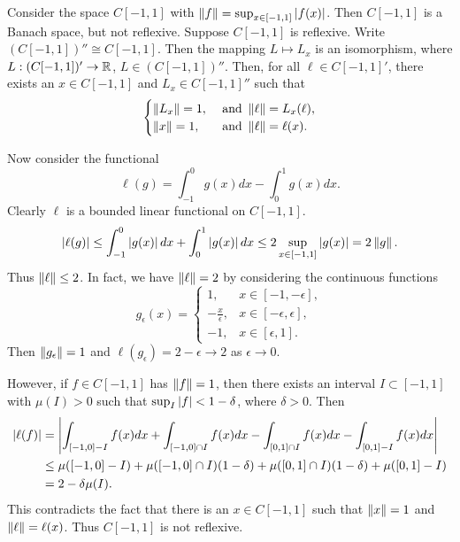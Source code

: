 \begin{example}
    Consider the space $C[-1,1]$ with $\left\lVert {f} \right\rVert = \sup_{x\in[-1,1]}\left\lvert {f(x)} \right\rvert$. 
    Then $C[-1,1]$ is a Banach space, but not reflexive. Suppose 
    $C[-1,1]$ is reflexive. Write $(C[-1,1])'' \cong C[-1,1]$. Then 
    the mapping $L\mapsto L_x$ is an isomorphism, where 
    $L:(C[-1,1])'\to\mathbb{R}$, $L\in(C[-1,1])''$. Then, for all $\ell\in C[-1,1]'$, 
    there exists an $x\in C[-1,1]$ and $L_x\in C[-1,1]''$ such that 
    \begin{equation*}
        \begin{cases}
            \left\lVert {L_x} \right\rVert = 1, &\text{ and } \left\lVert {\ell} \right\rVert = L_x(\ell), \\
            \left\lVert {x} \right\rVert = 1, &\text{ and } \left\lVert {\ell} \right\rVert = \ell(x).
        \end{cases}
    \end{equation*}
    
    Now consider the functional 
    \begin{equation*}
        \ell(g) = \int_{-1}^0 g(x)dx - \int_0^1 g(x)dx.
    \end{equation*}
    Clearly $\ell$ is a bounded linear functional on $C[-1,1]$. 
    \begin{equation*}
        \left\lvert {\ell(g)} \right\rvert \leq \int_{-1}^0 \left\lvert {g(x)} \right\rvert dx + \int_0^1 \left\lvert {g(x)} \right\rvert dx 
        \leq 2\sup_{x\in[-1,1]}\left\lvert {g(x)} \right\rvert = 2\left\lVert {g} \right\rVert.
    \end{equation*}
    Thus $\left\lVert {\ell} \right\rVert \leq 2$. In fact, we have $\left\lVert {\ell} \right\rVert = 2$ by considering 
    the continuous functions 
    \begin{equation*}
        g_\epsilon(x) = \begin{cases}
            1, & x\in[-1,-\epsilon], \\
            -\frac{x}{\epsilon}, & x\in[-\epsilon,\epsilon], \\ 
            -1, & x\in[\epsilon,1].
        \end{cases}
    \end{equation*} 
    Then $\left\lVert {g_\epsilon} \right\rVert = 1$ and $\ell(g_\epsilon) = 2-\epsilon\to 2$ 
    as $\epsilon\to 0$. 

    However, if $f\in C[-1,1]$ has $\left\lVert {f} \right\rVert = 1$, then there exists 
    an interval $I\subset[-1,1]$ with $\mu(I)>0$ such that $\sup_I \left\lvert {f} \right\rvert< 1-\delta$, 
    where $\delta>0$. Then 
    \begin{equation*}
        \begin{split}
            \left\lvert {\ell(f)} \right\rvert &= \left\lvert {\int_{[-1,0]-I} f(x)dx + \int_{[-1,0]\cap I} f(x)dx - \int_{[0,1]\cap I} f(x)dx - \int_{[0,1]-I} f(x)dx} \right\rvert \\
            &\leq \mu([-1,0]-I) + \mu([-1,0]\cap I)(1-\delta) + \mu([0,1]\cap I)(1-\delta) + \mu([0,1]-I) \\
            &= 2-\delta\mu(I). 
        \end{split}
    \end{equation*}
    This contradicts the fact that there is an $x\in C[-1,1]$ 
    such that $\left\lVert {x} \right\rVert = 1$ and $\left\lVert {\ell} \right\rVert = \ell(x)$. Thus 
    $C[-1,1]$ is not reflexive.
\end{example}

